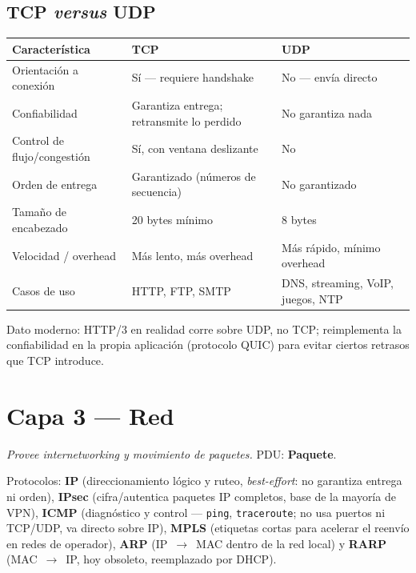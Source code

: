 \documentclass[11pt,a4paper]{article}
\begin{document}
\subsection*{TCP \textit{versus} UDP}
\begin{center}
\small
\begin{tabularx}{\textwidth}{@{}l X X@{}}
\toprule
\textbf{Característica} & \textbf{TCP} & \textbf{UDP} \\
\midrule
Orientación a conexión & Sí --- requiere handshake & No --- envía directo \\
Confiabilidad & Garantiza entrega; retransmite lo perdido & No garantiza nada \\
Control de flujo/congestión & Sí, con ventana deslizante & No \\
Orden de entrega & Garantizado (números de secuencia) & No garantizado \\
Tamaño de encabezado & 20 bytes mínimo & 8 bytes \\
Velocidad / overhead & Más lento, más overhead & Más rápido, mínimo overhead \\
Casos de uso & HTTP, FTP, SMTP & DNS, streaming, VoIP, juegos, NTP \\
\bottomrule
\end{tabularx}
\end{center}

\begin{examfact}
Dato moderno: HTTP/3 en realidad corre sobre UDP, no TCP; reimplementa la confiabilidad en la propia aplicación (protocolo QUIC) para evitar ciertos retrasos que TCP introduce.
\end{examfact}

\newpage
\section{Capa 3 --- Red}
\textit{Provee \textit{internetworking} y movimiento de paquetes.} PDU: \textbf{Paquete}.

Protocolos: \textbf{IP} (direccionamiento lógico y ruteo, \textit{best-effort}: no garantiza entrega ni orden), \textbf{IPsec} (cifra/autentica paquetes IP completos, base de la mayoría de VPN), \textbf{ICMP} (diagnóstico y control --- \texttt{ping}, \texttt{traceroute}; no usa puertos ni TCP/UDP, va directo sobre IP), \textbf{MPLS} (etiquetas cortas para acelerar el reenvío en redes de operador), \textbf{ARP} (IP~$\to$~MAC dentro de la red local) y \textbf{RARP} (MAC~$\to$~IP, hoy obsoleto, reemplazado por DHCP).
\end{document}
